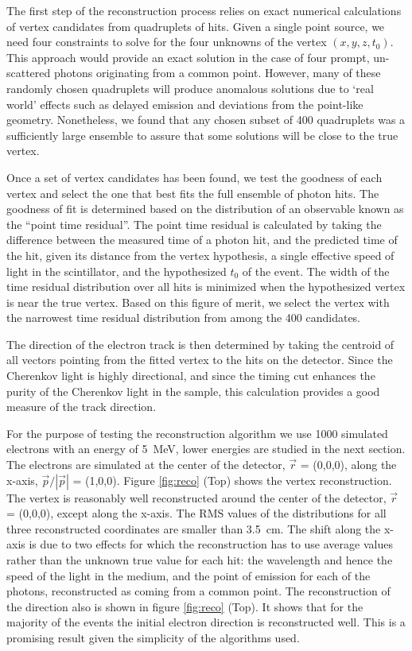 \documentclass[cits]{JINST}
\begin{document}
The first step of the reconstruction process relies on exact numerical
calculations of vertex candidates from quadruplets of hits. Given a
single point source, we need four constraints to solve for the four
unknowns of the vertex $(x,y,z,t_0)$\cite{Smy}. This approach
would provide an exact solution in the case of four prompt,
un-scattered photons originating from a common point. However, many of
these randomly chosen quadruplets will produce anomalous solutions due
to `real world' effects such as delayed emission and deviations from the
point-like geometry. Nonetheless, we found that any chosen subset of
400 quadruplets was a sufficiently large ensemble to assure that some
solutions will be close to the true vertex.

Once a set of vertex candidates has been found, we test the goodness
of each vertex and select the one that best fits the full ensemble of
photon hits. The goodness of fit is determined based on the
distribution of an observable known as the ``point time
residual''\cite{SuperKalgo}. The point time residual is calculated by
taking the difference between the measured time of a photon hit, and
the predicted time of the hit, given its distance from the vertex
hypothesis, a single effective speed of light in the scintillator, and
the hypothesized $t_0$ of the event. The width of the time residual
distribution over all hits is minimized when the hypothesized vertex
is near the true vertex. Based on this figure of merit, we select the
vertex with the narrowest time residual distribution from among the
400 candidates.

The direction of the electron track is then determined by taking the
centroid of all vectors pointing from the fitted vertex to the hits on
the detector. Since the Cherenkov light is highly directional, and
since the timing cut enhances the purity of the Cherenkov light in the
sample, this calculation provides a good measure of the track
direction. 

For the purpose of testing the reconstruction algorithm we use 1000
simulated electrons with an energy of 5~MeV, lower energies are studied in the next section.
The electrons are simulated at the center of the detector, $\vec{r}$ = (0,0,0), along
the x-axis, $\vec{p}/|\vec{p}|$ = (1,0,0). Figure \ref{fig:reco} (Top)
shows the vertex reconstruction. The vertex is reasonably well
reconstructed around the center of the detector, $\vec{r}$ = (0,0,0),
except along the x-axis. The RMS values of the distributions for all three
reconstructed coordinates are smaller than 3.5~cm. The shift along
the x-axis is due to two effects for which the reconstruction has to
use average values rather than the unknown true value for each
hit: the wavelength and hence the speed of the light in the medium,
and the point of emission for each of the photons, reconstructed
as coming from a common point. The reconstruction of the direction
also is shown in figure \ref{fig:reco} (Top). It shows that for the majority
of the events the initial electron direction is reconstructed well.
This is a promising result given the simplicity of the algorithms
used.
\end{document}
